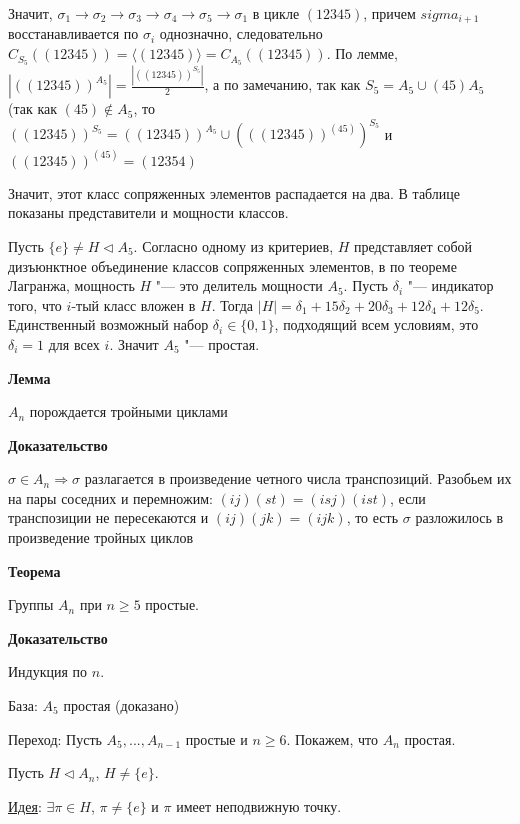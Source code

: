 \documentclass{article}
\begin{document}
Значит, $\sigma_1 \rightarrow \sigma_2 \rightarrow \sigma_3 \rightarrow \sigma_4 \rightarrow \sigma_5 \rightarrow \sigma_1$ в цикле $(1 2 3 4 5)$, причем $sigma_{i+1}$ восстанавливается по $\sigma_i$ однозначно, следовательно $C_{S_5}((1 2 3 4 5)) = \langle (1 2 3 4 5) \rangle = C_{A_5}((1 2 3 4 5))$. По лемме, $|((1 2 3 4 5))^{A_5}| = \frac{|((1 2 3 4 5))^{S_5}|}{2}$, а по замечанию, так как  $S_5 = A_5 \cup (4 5)A_5$ (так как $(4 5) \notin A_5$, то $((1 2 3 4 5))^{S_5} = ((1 2 3 4 5))^{A_5} \cup (((1 2 3 4 5))^{(4 5)})^{S_5}$ и $((1 2 3 4 5))^{(4 5)} = (1 2 3 5 4)$

Значит, этот класс сопряженных элементов распадается на два. В таблице показаны представители и мощности классов.

Пусть $\{e\} \neq H \triangleleft A_5$. Согласно одному из критериев, $H$ представляет собой дизъюнктное объединение классов сопряженных элементов, в по теореме Лагранжа, мощность $H$ "--- это делитель мощности $A_5$. Пусть $\delta_i$ "--- индикатор того, что $i$-тый класс вложен в $H$. Тогда $|H| = \delta_1 + 15\delta_2 + 20\delta_3 + 12\delta_4 + 12\delta_5$. Единственный возможный набор $\delta_i \in \{0, 1\}$, подходящий всем условиям, это $\delta_i = 1$ для всех $i$. Значит $A_5$ "--- простая.

\vspace{10pt}

\textbf{Лемма}

$A_n$ порождается тройными циклами  

\textbf{Доказательство}

$\sigma \in A_n \Rightarrow \sigma$ разлагается в произведение четного числа транспозиций. Разобьем их на пары соседних и перемножим: $(i j)(s t) = (i s j)(i s t)$, если транспозиции не пересекаются и $(i j)(j k) = (i j k)$, то есть $\sigma$ разложилось в произведение тройных циклов

\vspace{10pt}

\textbf{Теорема}

Группы $A_n$ при $n \geq 5$ простые.

\textbf{Доказательство}

Индукция по $n$.

База: $A_5$ простая (доказано)

Переход: Пусть $A_5, ..., A_{n-1}$ простые и $n \geq 6$. Покажем, что $A_n$ простая.

Пусть $H \triangleleft A_n$, $H \neq \{e\}$.

\underline{Идея}: $\exists \pi \in H$, $\pi \neq \{e\}$ и $\pi$ имеет неподвижную точку.
\end{document}
